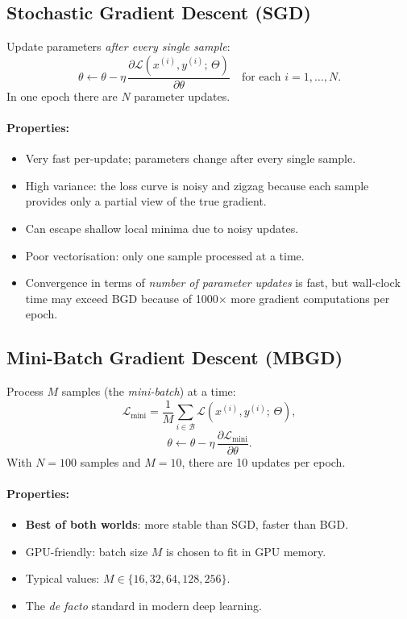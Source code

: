 \documentclass[12pt,a4paper]{article}
\newcommand{\Loss}{\mathcal{L}}
\newcommand{\pderiv}[2]{\dfrac{\partial #1}{\partial #2}}
\begin{document}
\subsection{Stochastic Gradient Descent (SGD)}

Update parameters \emph{after every single sample}:
\begin{equation}
  \theta \leftarrow \theta - \eta\,\pderiv{\Loss(x^{(i)}, y^{(i)};\,\Theta)}{\theta}
  \quad \text{for each } i = 1, \ldots, N.
  \label{eq:sgd-update}
\end{equation}
In one epoch there are $N$ parameter updates.

\paragraph{Properties:}
\begin{itemize}[leftmargin=2em]
  \item Very fast per-update; parameters change after every single sample.
  \item High variance: the loss curve is noisy and zigzag because each
        sample provides only a partial view of the true gradient.
  \item Can escape shallow local minima due to noisy updates.
  \item Poor vectorisation: only one sample processed at a time.
  \item Convergence in terms of \emph{number of parameter updates} is fast,
        but wall-clock time may exceed BGD because of 1000$\times$ more
        gradient computations per epoch.
\end{itemize}

\subsection{Mini-Batch Gradient Descent (MBGD)}

Process $M$ samples (the \emph{mini-batch}) at a time:
\begin{equation}
  \Loss_{\text{mini}} = \frac{1}{M}\sum_{i \in \mathcal{B}}\Loss(x^{(i)}, y^{(i)};\,\Theta),
  \label{eq:mbgd-loss}
\end{equation}
\begin{equation}
  \theta \leftarrow \theta - \eta\,\pderiv{\Loss_{\text{mini}}}{\theta}.
  \label{eq:mbgd-update}
\end{equation}
With $N=100$ samples and $M=10$, there are 10 updates per epoch.

\paragraph{Properties:}
\begin{itemize}[leftmargin=2em]
  \item \textbf{Best of both worlds}: more stable than SGD, faster than BGD.
  \item GPU-friendly: batch size $M$ is chosen to fit in GPU memory.
  \item Typical values: $M \in \{16, 32, 64, 128, 256\}$.
  \item The \emph{de facto} standard in modern deep learning.
\end{itemize}
\end{document}
